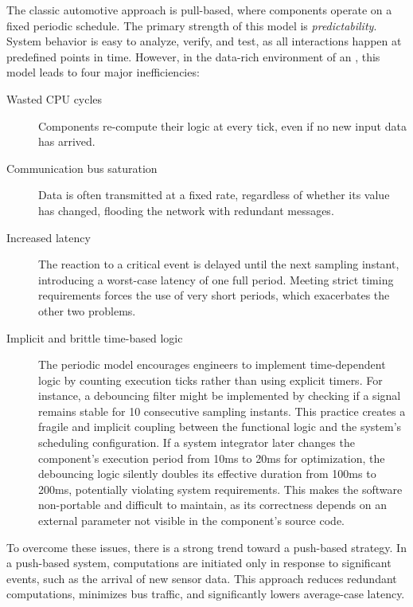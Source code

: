 The classic automotive approach is pull-based, where components operate on a fixed periodic
schedule. The primary strength of this model is \emph{predictability}. System behavior is easy to
analyze, verify, and test, as all interactions happen at predefined points in time. However, in the
data-rich environment of an \sdv, this model leads to four major inefficiencies:
\begin{description}
    \item[Wasted CPU cycles] Components re-compute their logic at every tick,
          even if no new input data has arrived.
    \item[Communication bus saturation] Data is often transmitted at a fixed
          rate, regardless of whether its value has changed, flooding the network with
          redundant messages.
    \item[Increased latency] The reaction to a critical event is delayed until
          the next sampling instant, introducing a worst-case latency of one full period.
          Meeting strict timing requirements forces the use of very short periods, which
          exacerbates the other two problems.
    \item[Implicit and brittle time-based logic] The periodic model encourages
          engineers to implement time-dependent logic by counting execution ticks rather
          than using explicit timers. For instance, a debouncing filter might be implemented
          by checking if a signal remains stable for 10 consecutive sampling instants.
          This practice creates a fragile and implicit coupling between the functional
          logic and the system's scheduling configuration. If a system integrator later
          changes the component's execution period from 10ms to 20ms for optimization,
          the debouncing logic silently doubles its effective duration from 100ms to 200ms,
          potentially violating system requirements. This makes the software non-portable
          and difficult to maintain, as its correctness depends on an external parameter
          not visible in the component's source code.
\end{description}

To overcome these issues, there is a strong trend toward a push-based strategy. In a push-based
system, computations are initiated only in response to significant events, such as the arrival of
new sensor data. This approach reduces redundant computations, minimizes bus traffic, and
significantly lowers average-case latency.


